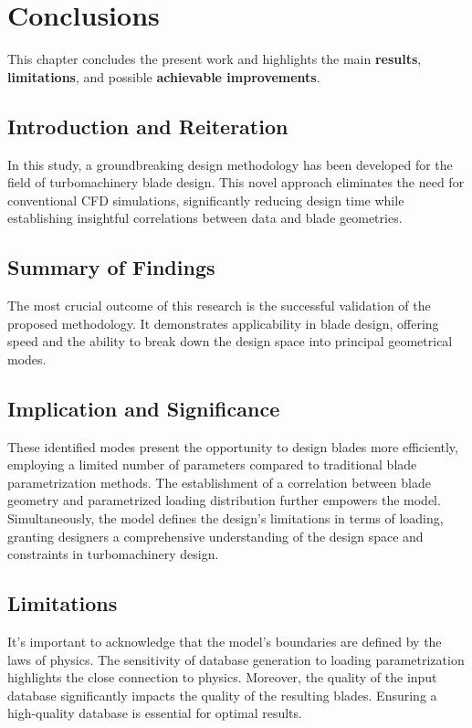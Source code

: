 \chapter{Conclusions}

This chapter concludes the present work and highlights the main \textbf{results}, \textbf{limitations}, and possible \textbf{achievable improvements}.

\section{Introduction and Reiteration}

In this study, a groundbreaking design methodology has been developed for the field of turbomachinery blade design. This novel approach eliminates the need for conventional CFD simulations, significantly reducing design time while establishing insightful correlations between data and blade geometries.

\section{Summary of Findings}

The most crucial outcome of this research is the successful validation of the proposed methodology. It demonstrates applicability in blade design, offering speed and the ability to break down the design space into principal geometrical modes.

\section{Implication and Significance}

These identified modes present the opportunity to design blades more efficiently, employing a limited number of parameters compared to traditional blade parametrization methods. The establishment of a correlation between blade geometry and parametrized loading distribution further empowers the model. Simultaneously, the model defines the design's limitations in terms of loading, granting designers a comprehensive understanding of the design space and constraints in turbomachinery design.

\section{Limitations}

It's important to acknowledge that the model's boundaries are defined by the laws of physics. The sensitivity of database generation to loading parametrization highlights the close connection to physics. Moreover, the quality of the input database significantly impacts the quality of the resulting blades. Ensuring a high-quality database is essential for optimal results.

